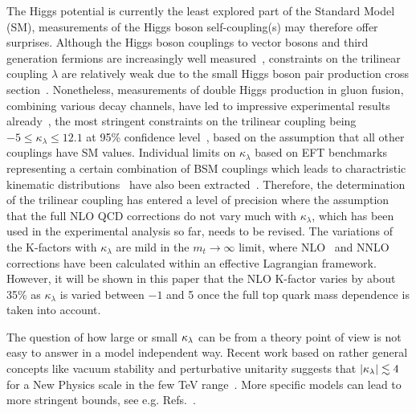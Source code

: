 The Higgs potential is currently the least explored part of the Standard Model (SM), measurements of the Higgs boson self-coupling(s) may therefore offer surprises.
Although the Higgs boson couplings to vector bosons and third generation fermions are increasingly well measured~\cite{Khachatryan:2016vau,Aaboud:2017vzb,ATLAS:2018doi,Sirunyan:2018koj,Sirunyan:2018sgc}, constraints on the trilinear coupling $\lambda$ are relatively weak due to the small Higgs boson pair production cross section~\cite{Baglio:2012np,Frederix:2014hta}.  
Nonetheless, measurements of double Higgs production in gluon fusion, combining various decay channels,  have led to impressive experimental results already~\cite{Sirunyan:2018two,Sirunyan:2018iwt,ATLAS-CONF-2018-043,Aaboud:2018ftw}, 
the most stringent constraints on the trilinear coupling being $-5\leq \kappa_\lambda\leq 12.1$
 at 95\% confidence level~\cite{ATLAS-CONF-2018-043}, based on the assumption that all other couplings have SM values.
Individual limits on $\kappa_\lambda$ based on EFT benchmarks representing a certain combination of BSM couplings which leads to charactristic kinematic distributions~\cite{Carvalho:2015ttv,Carvalho:2016rys,Buchalla:2018yce} have also been extracted~\cite{Sirunyan:2018two,Sirunyan:2018iwt}.
Therefore, the determination of the trilinear coupling has entered a level of precision where the assumption that the full NLO QCD corrections do not vary much with $\kappa_\lambda$, which has been used in the experimental analysis so far, needs to be revised.
The variations of the K-factors with $\kappa_\lambda$ are mild in the $m_t\to \infty$ limit, where NLO~\cite{Grober:2015cwa,Grober:2017gut} and NNLO~\cite{deFlorian:2017qfk} corrections have been calculated within an effective Lagrangian framework.
However, it will be shown in this paper that the NLO K-factor varies by about 35\% as $\kappa_\lambda$ is varied between $-1$ and 5 once the full top quark mass dependence is taken into account. 

The question of how large or small $\kappa_{\lambda}$ can be from a theory point of view is not easy to answer in a model independent way. 
Recent work based on rather general concepts like vacuum stability and perturbative unitarity suggests that $|\kappa_{\lambda}|\lesssim 4$ for a New Physics scale in the few TeV range~\cite{Falkowski:2019tft,Chang:2019vez,DiLuzio:2017tfn,DiVita:2017eyz}.
More specific models can lead to more stringent bounds, see e.g. Refs.~\cite{Braathen:2019pxr,Basler:2018dac,Babu:2018uik,Lewis:2017dme}.

\medskip


